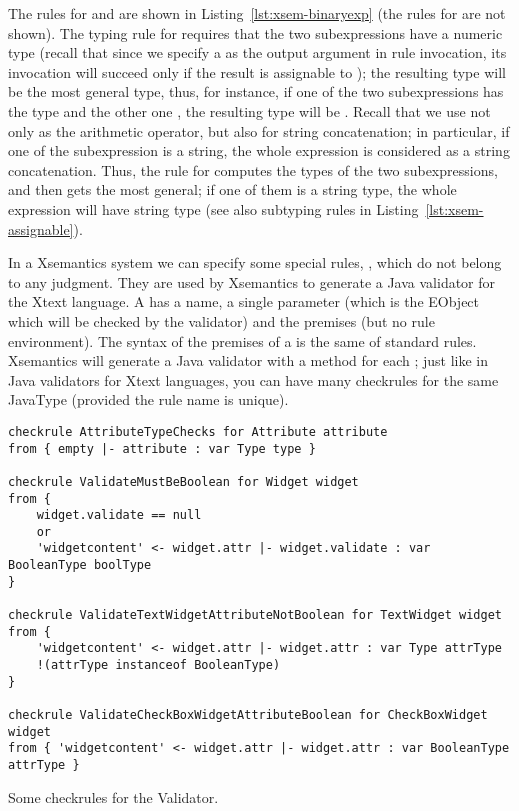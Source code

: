 The rules for  and  are shown in
Listing~\ref{lst:xsem-binaryexp} (the rules for  are not
shown).
The typing rule for  requires that the two subexpressions have a
numeric type (recall that since we specify a  as the output
argument in rule invocation, its invocation will succeed only if the result is
assignable to ); the resulting type will be the most general
type, thus, for instance, if one of the two subexpressions has the type
 and the other one , the resulting type will be
.  Recall that we use \mytt{+} not only as the arithmetic
operator, but also for string concatenation; in particular, if one of the
subexpression is a string, the whole expression is considered as a string
concatenation.  Thus, the rule for  computes the types of the two
subexpressions, and then gets the most general; if one of them is a string type,
the whole expression will have string type (see also subtyping rules in
Listing~\ref{lst:xsem-assignable}).


In a Xsemantics system we can specify some special rules,
, which do not belong to any judgment. They are used by
Xsemantics to generate a Java validator for the Xtext language.  A
 has a name, a single parameter (which is the EObject which will
be checked by the validator) and the premises (but no rule environment).  The
syntax of the premises of a  is the same of standard rules.
Xsemantics will generate a Java validator with a \checkm{} method for each
; just like in Java validators for Xtext languages, you can have
many checkrules for the same JavaType (provided the rule name is unique).

\begin{listing}[tb]
\begin{lstlisting}[language=xsemantics] 
checkrule AttributeTypeChecks for Attribute attribute
from { empty |- attribute : var Type type }

checkrule ValidateMustBeBoolean for Widget widget
from {
	widget.validate == null
	or 
	'widgetcontent' <- widget.attr |- widget.validate : var BooleanType boolType
}

checkrule ValidateTextWidgetAttributeNotBoolean for TextWidget widget
from {
	'widgetcontent' <- widget.attr |- widget.attr : var Type attrType
	!(attrType instanceof BooleanType)
}

checkrule ValidateCheckBoxWidgetAttributeBoolean for CheckBoxWidget widget
from { 'widgetcontent' <- widget.attr |- widget.attr : var BooleanType attrType }
\end{lstlisting}
\caption{Some checkrules for the Validator.}
\label{lst:xsem-validator}
\end{listing}

